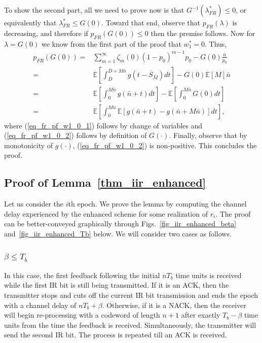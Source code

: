 \documentclass[12pt,journal,onecolumn]{IEEEtran}
\begin{document}
To show the second part, all we need to prove now is that $G^{-1}\left(\lambda^*_{FR}\right)\leq0$, or equivalently that $\lambda^*_{FR}\leq G(0)$. Toward that end, observe that $p_{FR}(\lambda)$ is decreasing, and therefore if $p_{FR}\left(G(0)\right)\leq0$ then the premise follows. Now for $\lambda=G(0)$ we know from the first part of the proof that $w_1^*=0$. Thus,
\begin{align}
p_{FR}\left(G(0)\right)=&\sum_{m=1}^\infty\zeta_m\left(0\right)(1-p_0)^{m-1}p_0-G(0)\frac{\bar{n}}{p_0} \\
=&\mathbb{E}\left[\int_{\overline{D}}^{\overline{D}+M\bar{n}}g\left(t-\overline{S}_{\bar{M}}\right)dt\right]-G(0)\mathbb{E}\left[M\right]\bar{n} \\
=&\mathbb{E}\left[\int_{0}^{M\bar{n}}g\left(\bar{n}+t\right)dt\right]-\mathbb{E}\left[\int_0^{M\bar{n}}G(0)dt\right] \label{eq_fr_pf_w1_0_1} \\
=&\mathbb{E}\left[\int_{0}^{M\bar{n}}\mathbb{E}\left[g\left(\bar{n}+t\right)-g\left(\bar{n}+M\bar{n}\right)\right]dt\right],\label{eq_fr_pf_w1_0_2}
\end{align}	
where (\ref{eq_fr_pf_w1_0_1}) follows by change of variables and (\ref{eq_fr_pf_w1_0_2}) follows by definition of $G(\cdot)$. Finally, observe that by monotonicity of $g(\cdot)$, (\ref{eq_fr_pf_w1_0_2}) is non-positive. This concludes the proof.


\subsection{Proof of Lemma~\ref{thm_iir_enhanced}} \label{apndx_pf_iir_enhanced}

Let us consider the $i$th epoch. We prove the lemma by computing the channel delay experienced by the enhanced scheme for some realization of $r_i$. The proof can be better-conveyed graphically through Figs.~\ref{fig_iir_enhanced_beta} and~\ref{fig_iir_enhanced_Tb} below. We will consider two cases as follows.

\subsubsection{$\beta\leq T_b$}

In this case, the first feedback following the initial $nT_b$ time units is received while the first IR bit is still being transmitted. If it is an ACK, then the transmitter stops and cuts off the current IR bit transmission and ends the epoch with a channel delay of $nT_b+\beta$. Otherwise, if it is a NACK, then the receiver will begin re-processing with a codeword of length $n+1$ after exactly $T_b-\beta$ time units from the time the feedback is received. Simultaneously, the transmitter will send the second IR bit. The process is repeated till an ACK is received.
\end{document}
